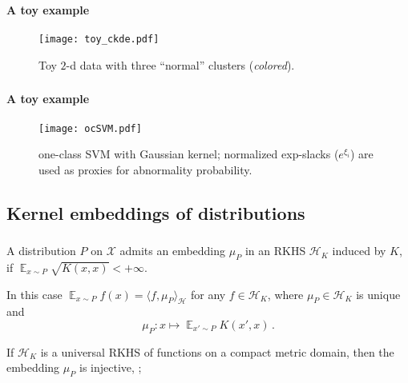 \documentclass[t]{beamer}  %
\newcommand{\Xcal}{\mathcal{X}}
\newcommand{\Hcal}{\mathcal{H}}
\newcommand{\ex}{\mathop{\mathbb{E}}\nolimits}
\begin{document}
\begin{frame}[c]\frametitle{\insertsection}
  \framesubtitle{A toy example}
  \begin{figure}%
    \centering
    \texttt{[image: toy\_ckde.pdf]}
    \caption{Toy $2$-d data with three ``normal'' clusters (\textit{colored}).}
    \label{fig:toy}
  \end{figure}
\end{frame}

\begin{frame}[c]\frametitle{\insertsection}
  \framesubtitle{A toy example}
  \begin{figure}%
    \centering
    \texttt{[image: ocSVM.pdf]}
    \caption{one-class SVM with Gaussian kernel; normalized exp-slacks ($e^{\xi_i}$)
    are used as proxies for abnormality probability.}
    \label{fig:ocsvm}
  \end{figure}
\end{frame}

\subsection{Kernel embeddings of distributions} %
\label{sub:kernel_embeddings_of_distributions}

\begin{frame}[c]\frametitle{\insertsection}
  \framesubtitle{\insertsubsection}
  A distribution $P$ on $\Xcal$ admits an embedding $\mu_P$ in an RKHS $\Hcal_K$
  induced by $K$, if $\ex_{x\sim P} \sqrt{K(x,x)} < +\infty$.
  
  \vspace{\baselineskip}
  In this case $\ex_{x\sim P} f(x) = \langle f, \mu_P \rangle_\Hcal$ for any
  $f\in \Hcal_K$, where $\mu_P\in \Hcal_K$ is unique and
  $$ \mu_P: x \mapsto \ex_{x'\sim P} K(x', x) \,. $$
  
  \vspace{\baselineskip}
  If $\Hcal_K$ is a universal RKHS of functions on a compact metric domain, then
  the embedding $\mu_P$ is injective, \cite{gretton2012};
\end{frame}
\end{document}

